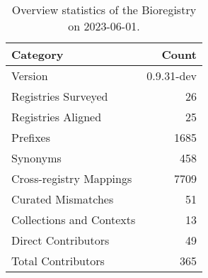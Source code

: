 \begin{table}
\caption{Overview statistics of the Bioregistry on 2023-06-01.}
\label{tab:bioregistry-summary}
\begin{tabular}{lr}
\toprule
Category & Count \\
\midrule
Version & 0.9.31-dev \\
Registries Surveyed & 26 \\
Registries Aligned & 25 \\
Prefixes & 1685 \\
Synonyms & 458 \\
Cross-registry Mappings & 7709 \\
Curated Mismatches & 51 \\
Collections and Contexts & 13 \\
Direct Contributors & 49 \\
Total Contributors & 365 \\
\bottomrule
\end{tabular}
\end{table}
